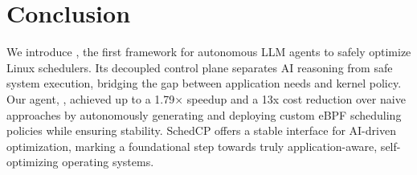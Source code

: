 \section{Conclusion}
\label{sec:conclusion}

We introduce \sys, the first framework for autonomous LLM agents to safely optimize Linux schedulers. Its decoupled control plane separates AI reasoning from safe system execution, bridging the gap between application needs and kernel policy. Our agent, \agent, achieved up to a 1.79× speedup and a 13x cost reduction over naive approaches by autonomously generating and deploying custom eBPF scheduling policies while ensuring stability. SchedCP offers a stable interface for AI-driven optimization, marking a foundational step towards truly application-aware, self-optimizing operating systems.







